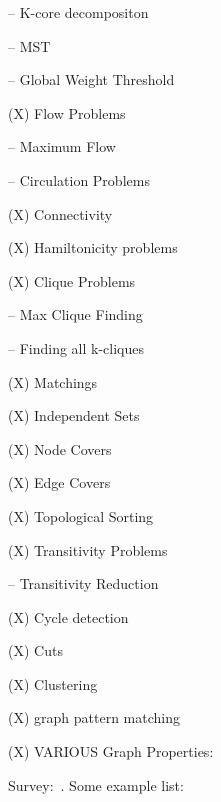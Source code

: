 \documentclass[preprint]{sig-alternate-05-2015}
\begin{document}
-- K-core decompositon

-- MST

-- Global Weight Threshold


(X) Flow Problems

-- Maximum Flow

-- Circulation Problems


(X) Connectivity


(X) Hamiltonicity problems


(X) Clique Problems

-- Max Clique Finding

-- Finding all k-cliques


(X) Matchings


(X) Independent Sets


(X) Node Covers


(X) Edge Covers


(X) Topological Sorting


(X) Transitivity Problems


-- Transitivity Reduction


(X) Cycle detection


(X) Cuts


(X) Clustering


(X) graph pattern matching


(X) VARIOUS Graph Properties:

Survey:~\cite{hu2013survey}.  Some example list:
\end{document}
